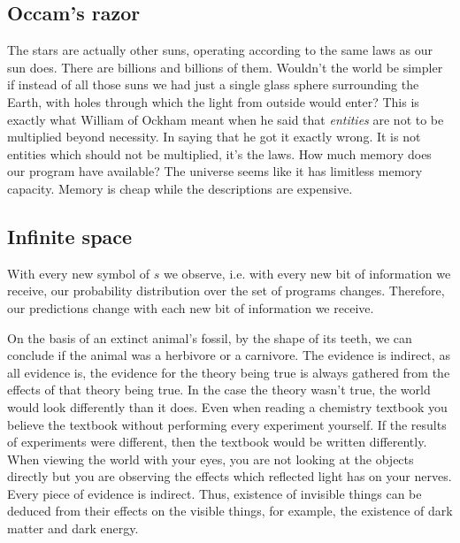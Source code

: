 \documentclass[oneside,hidelinks]{article}
\begin{document}
\newpage

\subsection{Occam's razor}

The stars are actually other suns, operating according to the same laws as our sun does.
There are billions and billions of them.
Wouldn't the world be simpler if instead of all those suns we had just a single glass sphere surrounding the Earth, with holes through which the light from outside would enter?
This is exactly what William of Ockham meant when he said that \textit{entities} are not to be multiplied beyond necessity.
In saying that he got it exactly wrong.
It is not entities which should not be multiplied, it's the laws.
How much memory does our program have available?
The universe seems like it has limitless memory capacity.
Memory is cheap while the descriptions are expensive.

\newpage

\subsection{Infinite space}

With every new symbol of $s$ we observe, i.e. with every new bit of information we receive, our probability distribution over the set of programs changes.
Therefore, our predictions change with each new bit of information we receive.

On the basis of an extinct animal's fossil, by the shape of its teeth, we can conclude if the animal was a herbivore or a carnivore.
The evidence is indirect, as all evidence is, the evidence for the theory being true is always gathered from the effects of that theory being true.
In the case the theory wasn't true, the world would look differently than it does.
Even when reading a chemistry textbook you believe the textbook without performing every experiment yourself.
If the results of experiments were different, then the textbook would be written differently.
When viewing the world with your eyes, you are not looking at the objects directly but you are observing the effects which reflected light has on your nerves.
Every piece of evidence is indirect.
Thus, existence of invisible things can be deduced from their effects on the visible things, for example, the existence of dark matter and dark energy.
\end{document}
